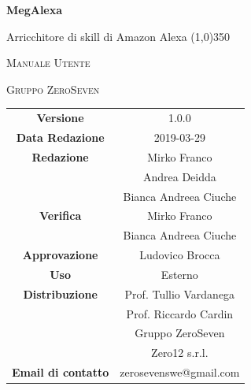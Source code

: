\documentclass[a4paper,12pt,openany]{book}
\author{Ludovico Brocca}
\date{2018-12-19}
\begin{document}
\begin{titlepage}
	\centering
	{\huge\bfseries MegAlexa \par}
	Arricchitore di skill di Amazon Alexa
	\line(1,0){350} \\
	{\scshape\LARGE Manuale Utente \par}
	\vspace{1cm}
	{\scshape Gruppo ZeroSeven \par}
	\logo
	\begin{tabular}{c|c}
		{\hfill \textbf{Versione}} 			& 1.0.0 \\
		{\hfill\textbf{Data Redazione}} 	& 2019-03-29	\\ 
		{\hfill\textbf{Redazione}} 		& Mirko Franco \\ & Andrea Deidda \\& Bianca Andreea Ciuche \\
		{\hfill\textbf{Verifica}} 				&  	Mirko Franco \\ & Bianca Andreea Ciuche \\
		{\hfill\textbf{Approvazione}} 		&  Ludovico Brocca \\
		{\hfill\textbf{Uso}} 					& 		Esterno		\\ 
		{\hfill\textbf{Distribuzione}} 			& 			Prof. Tullio Vardanega \\ & Prof. Riccardo Cardin \\ & Gruppo ZeroSeven	\\ & Zero12 s.r.l. \\
		{\hfill\textbf{Email di contatto}} & zerosevenswe@gmail.com \\
	\end{tabular}
\end{titlepage}
	
	\label{LastFrontPage}
	\newpage	
	
	\pagestyle{mymain}
	\tableofcontents
	\listoffigures
	
	
	
	
	\appendix
	
	\label{LastPage}
\end{document}
